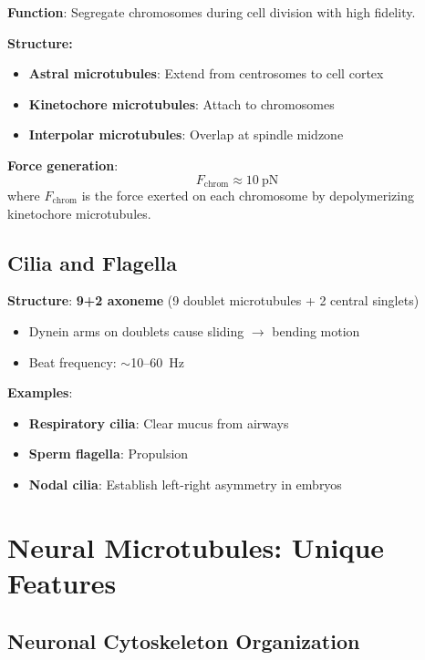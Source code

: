 \textbf{Function}: Segregate chromosomes during cell division with high fidelity.

\textbf{Structure:}
\begin{itemize}
\item \textbf{Astral microtubules}: Extend from centrosomes to cell cortex
\item \textbf{Kinetochore microtubules}: Attach to chromosomes
\item \textbf{Interpolar microtubules}: Overlap at spindle midzone
\end{itemize}

\textbf{Force generation}:
\begin{equation}
F_{\mathrm{chrom}} \approx 10~\mathrm{pN}
\end{equation}
where $F_{\mathrm{chrom}}$ is the force exerted on each chromosome by depolymerizing kinetochore microtubules.

\subsection{Cilia and Flagella}
\label{subsec:cilia-flagella}

\textbf{Structure}: \textbf{9+2 axoneme} (9 doublet microtubules + 2 central singlets)
\begin{itemize}
\item Dynein arms on doublets cause sliding $\rightarrow$ bending motion
\item Beat frequency: $\sim$10--60~Hz
\end{itemize}

\textbf{Examples}:
\begin{itemize}
\item \textbf{Respiratory cilia}: Clear mucus from airways
\item \textbf{Sperm flagella}: Propulsion
\item \textbf{Nodal cilia}: Establish left-right asymmetry in embryos
\end{itemize}


\section{Neural Microtubules: Unique Features}
\label{sec:neural-microtubules}

\subsection{Neuronal Cytoskeleton Organization}
\label{subsec:neuronal-cytoskeleton}

